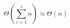 \documentclass{article}
\begin{document}
\[\Theta\left(\sum_{i=1}^i{n}\right)\approx\Theta\left(n\right)\]
\end{document}
